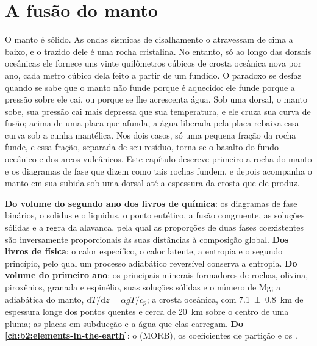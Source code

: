\chapter{A fusão do manto}\label{ch:b2:mantle-melting}

O manto é sólido. As ondas sísmicas de cisalhamento o atravessam de cima a baixo, e o
 trazido dele é uma rocha cristalina. No entanto, só ao longo das dorsais oceânicas
ele fornece uns vinte quilômetros cúbicos de crosta oceânica nova por ano,
cada metro cúbico dela feito a partir de um fundido. O paradoxo se desfaz quando se sabe
que o manto não funde porque é aquecido: ele funde porque a
pressão sobre ele cai, ou porque se lhe acrescenta água. Sob uma dorsal, o
manto sobe, sua pressão cai mais depressa que sua temperatura, e ele cruza sua
curva de fusão; acima de uma placa que afunda, a água liberada pela placa rebaixa essa
curva sob a cunha mantélica. Nos dois casos, só uma pequena fração da rocha
funde, e essa fração, separada de seu resíduo, torna-se o basalto do
fundo oceânico e dos arcos vulcânicos. Este capítulo descreve primeiro a rocha do
manto e os diagramas de fase que dizem como tais rochas fundem, e depois acompanha o
manto em sua subida sob uma dorsal até a espessura da crosta que ele produz.

\begin{recall}
\textbf{Do volume do segundo ano dos livros de química}: os diagramas de fase binários, o
solidus e o liquidus, o ponto eutético, a fusão congruente, as soluções sólidas
e a regra da alavanca, pela qual as proporções de duas fases coexistentes são
inversamente proporcionais às suas distâncias à composição global.
\textbf{Dos livros de física}: o calor específico, o calor latente, a entropia
e o segundo princípio, pelo qual um processo adiabático reversível conserva a entropia.
\textbf{Do volume do primeiro ano}: os principais minerais formadores de rochas, olivina,
piroxênios, granada e espinélio, suas soluções sólidas e o número de Mg; a
adiabática do manto, $\mathrm dT/\mathrm dz = \alpha gT/c_p$; a crosta oceânica,
com \qty[uncertainty-mode=separate]{7.1 \pm 0.8}{km} de espessura longe dos pontos quentes e
cerca de \qty{20}{km} sobre o centro de uma pluma; as placas em subducção e a água que elas
carregam. \textbf{Do \cref{ch:b2:elements-in-the-earth}}: o 
(MORB), os coeficientes de partição e os .
\end{recall}

